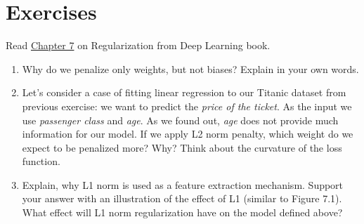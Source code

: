 \def\pathToRoot{../../}


\def\issolution{}




\section*{Exercises}

\begin{exercise}
\end{exercise}

Read \href{https://www.deeplearningbook.org/contents/regularization.html}{Chapter 7} on Regularization from Deep Learning book.


\begin{enumerate}

	\item Why do we penalize only weights, but not biases? Explain in your own words.
	\item Let's consider a case of fitting linear regression to our Titanic dataset from previous exercise: we want to predict the \textit{price of the ticket}. 
	As the input we use \textit{passenger class} and \textit{age}. As we found out, \textit{age} does not provide much information for our model. 
	If we apply L2 norm penalty, which weight do we expect to be penalized more? Why? Think about the curvature of the loss function.
	\item Explain, why L1 norm is used as a feature extraction mechanism. Support your answer with an illustration of the effect of L1 (similar to Figure 7.1). What effect will L1 norm regularization have on the model defined above?

\end{enumerate}

\begin{solution}
   

\end{solution}


